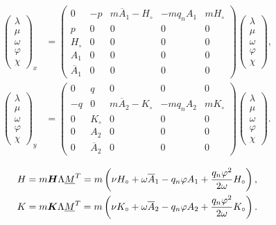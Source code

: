 \documentclass[10pt,a4paper]{amsart}
\def\bH{\mbox{\boldmath $H$}}
\def\bK{\mbox{\boldmath $K$}}
\def\uM{\underline{M}}
\begin{document}
\begin{equation}
\label{eq:Lax_pair}
\begin{aligned}
\begin{pmatrix}
\lambda \\
\mu \\
\omega \\
\varphi \\
\chi
\end{pmatrix}_x &=
\begin{pmatrix}
0 & -p & m \overline{A}_1 - H_\circ & - m q_n A_1 & m H_\circ \\
p & 0 & 0 & 0 & 0 \\
H_\circ & 0 & 0 & 0 & 0 \\
A_1 & 0 & 0 & 0 & 0 \\
\overline{A}_1 & 0 & 0 & 0 & 0
\end{pmatrix}
\begin{pmatrix}
\lambda \\
\mu \\
\omega \\
\varphi \\
\chi
\end{pmatrix}, \\
%
\begin{pmatrix}
\lambda \\
\mu \\
\omega \\
\varphi \\
\chi
\end{pmatrix}_y &=
\begin{pmatrix}
0 & q & 0 & 0 & 0 \\
-q & 0 & m \overline{A}_2 - K_\circ & - m q_n A_2 & m K_\circ \\
0 & K_\circ & 0 & 0 & 0 \\
0 & A_2 & 0 & 0 & 0 \\
0 & \overline{A}_2 & 0 & 0 & 0
\end{pmatrix}
\begin{pmatrix}
\lambda \\
\mu \\
\omega \\
\varphi \\
\chi
\end{pmatrix}.
\end{aligned}
\end{equation}

\begin{equation}
\label{eq:eqn_H_K}
\begin{aligned}
H &= m \bH \Lambda \uM^T
= m \left( \nu H_\circ + \omega \overline{A}_1 - q_n \varphi A_1 + \frac{q_n \varphi^2}{2\omega} H_\circ \right),\\
K &= m \bK \Lambda \uM^T
= m \left( \nu K_\circ + \omega \overline{A}_2 - q_n \varphi A_2 + \frac{q_n \varphi^2}{2\omega} K_\circ \right).
\end{aligned}
\end{equation}
\end{document}
